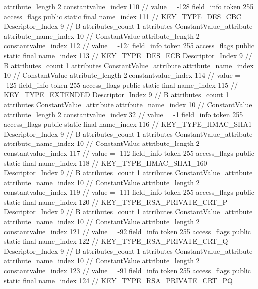 {{{{{{{					attribute_length	2
					constantvalue_index	110		// value = -128
				}
				}
			}
			field_info {
				token	255
				access_flags	public static final
				name_index	111		// KEY_TYPE_DES_CBC
				Descriptor_Index	9		// B
				attributes_count	1
				attributes {
				ConstantValue_attribute {
					attribute_name_index	10		// ConstantValue
					attribute_length	2
					constantvalue_index	112		// value = -124
				}
				}
			}
			field_info {
				token	255
				access_flags	public static final
				name_index	113		// KEY_TYPE_DES_ECB
				Descriptor_Index	9		// B
				attributes_count	1
				attributes {
				ConstantValue_attribute {
					attribute_name_index	10		// ConstantValue
					attribute_length	2
					constantvalue_index	114		// value = -125
				}
				}
			}
			field_info {
				token	255
				access_flags	public static final
				name_index	115		// KEY_TYPE_EXTENDED
				Descriptor_Index	9		// B
				attributes_count	1
				attributes {
				ConstantValue_attribute {
					attribute_name_index	10		// ConstantValue
					attribute_length	2
					constantvalue_index	32		// value = -1
				}
				}
			}
			field_info {
				token	255
				access_flags	public static final
				name_index	116		// KEY_TYPE_HMAC_SHA1
				Descriptor_Index	9		// B
				attributes_count	1
				attributes {
				ConstantValue_attribute {
					attribute_name_index	10		// ConstantValue
					attribute_length	2
					constantvalue_index	117		// value = -112
				}
				}
			}
			field_info {
				token	255
				access_flags	public static final
				name_index	118		// KEY_TYPE_HMAC_SHA1_160
				Descriptor_Index	9		// B
				attributes_count	1
				attributes {
				ConstantValue_attribute {
					attribute_name_index	10		// ConstantValue
					attribute_length	2
					constantvalue_index	119		// value = -111
				}
				}
			}
			field_info {
				token	255
				access_flags	public static final
				name_index	120		// KEY_TYPE_RSA_PRIVATE_CRT_P
				Descriptor_Index	9		// B
				attributes_count	1
				attributes {
				ConstantValue_attribute {
					attribute_name_index	10		// ConstantValue
					attribute_length	2
					constantvalue_index	121		// value = -92
				}
				}
			}
			field_info {
				token	255
				access_flags	public static final
				name_index	122		// KEY_TYPE_RSA_PRIVATE_CRT_Q
				Descriptor_Index	9		// B
				attributes_count	1
				attributes {
				ConstantValue_attribute {
					attribute_name_index	10		// ConstantValue
					attribute_length	2
					constantvalue_index	123		// value = -91
				}
				}
			}
			field_info {
				token	255
				access_flags	public static final
				name_index	124		// KEY_TYPE_RSA_PRIVATE_CRT_PQ
}}}}}
